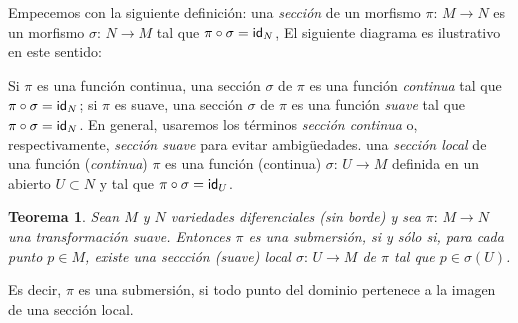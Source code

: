\theoremstyle{plain}
\newtheorem{teoSeccionesLocales}{Teorema}[section]
\newtheorem{propoSubmersionEsAbierta}[teoSeccionesLocales]{Proposici\'{o}n}
\newtheorem{coroSubmersionSobreEsCociente}[teoSeccionesLocales]{Corolario}
\newtheorem{propoSubmersionesExtra}[teoSeccionesLocales]{Proposici\'{o}n}
\newtheorem{coroUnicidadDelCociente}[teoSeccionesLocales]{Corolario}

\theoremstyle{remark}
\newtheorem{obsCaracterizaSubmersionesSobre}{Observaci\'{o}n}[section]


Empecemos con la siguiente definici\'{o}n: una \emph{secci\'{o}n} de un
morfismo $\pi:\,M\rightarrow N$ es un morfismo $\sigma:\,N\rightarrow M$
tal que $\pi\circ\sigma =\id[N]$, El siguiente diagrama es ilustrativo
en este sentido:
\begin{center}
\end{center}

Si $\pi$ es una funci\'{o}n continua, una secci\'{o}n $\sigma$ de $\pi$ es
una funci\'{o}n \emph{continua} tal que $\pi\circ\sigma=\id[N]$; si
$\pi$ es suave, una secci\'{o}n $\sigma$ de $\pi$ es una funci\'{o}n
\emph{suave} tal que $\pi\circ\sigma=\id[N]$. En general, usaremos los
t\'{e}rminos \emph{secci\'{o}n continua} o, respectivamente,
\emph{secci\'{o}n suave} para evitar ambig\"{u}edades. una
\emph{secci\'{o}n local} de una funci\'{o}n (\emph{continua}) $\pi$ es
una funci\'{o}n (continua) $\sigma:\,U\rightarrow M$ definida en un abierto
$U\subset N$ y tal que $\pi\circ\sigma=\id[U]$.

\begin{teoSeccionesLocales}\label{thm:seccioneslocales}
	Sean $M$ y $N$ variedades diferenciales (\emph{sin} borde) y sea
	$\pi:\,M\rightarrow N$ una transformaci\'{o}n suave. Entonces
	$\pi$ es una submersi\'{o}n, si y s\'{o}lo si, para cada punto
	$p\in M$, existe una seccci\'{o}n (suave) local
	$\sigma:\,U\rightarrow M$ de $\pi$ tal que $p\in\sigma(U)$.
\end{teoSeccionesLocales}

Es decir, $\pi$ es una submersi\'{o}n, si todo punto del dominio pertenece
a la imagen de una secci\'{o}n local.

